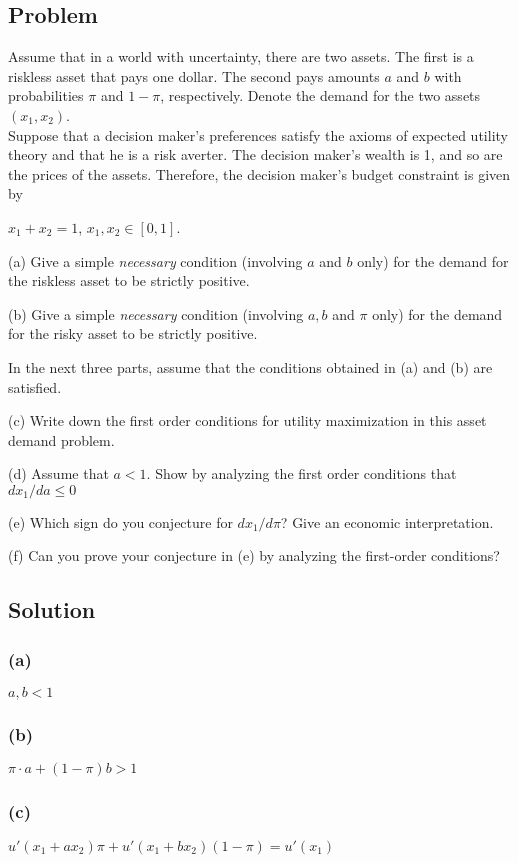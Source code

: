 \documentclass[10pt, a4paper]{article}
\begin{document}
    \subsection*{Problem}
      Assume that in a world with uncertainty, there are two assets. The first is a riskless asset that pays one dollar. The second pays amounts $a$ and $b$ with probabilities $\pi$ and $1-\pi$, respectively. Denote the demand for the two assets $(x_1,x_2)$. \\
      Suppose that a decision maker's preferences satisfy the axioms of expected utility theory and that he is a risk averter. The decision maker's wealth is 1, and so are the prices of the assets. Therefore, the decision maker's budget constraint is given by 
      \begin{center}
        $x_1+x_2=1$, $x_1,x_2\in[0,1]$.
      \end{center}

      (a) Give a simple \textit{necessary} condition (involving $a$ and $b$ only) for the demand for the riskless asset to be strictly positive.

      (b) Give a simple \textit{necessary} condition (involving $a,b$ and $\pi$ only) for the demand for the risky asset to be strictly positive.
     
      In the next three parts, assume that the conditions obtained in (a) and (b) are satisfied.

      (c) Write down the first order conditions for utility maximization in this asset demand problem.

      (d) Assume that $a<1$. Show by analyzing the first order conditions that $dx_1/da\leq0$

      (e) Which sign do you conjecture for $dx_1/d\pi$? Give an economic interpretation.

      (f) Can you prove your conjecture in (e) by analyzing the first-order conditions?
    \subsection*{Solution}
      \subsubsection*{(a)}
        $a,b < 1$
      \subsubsection*{(b)}
        $\pi\cdot a + (1-\pi)b > 1$
      \subsubsection*{(c)}
        $u'(x_1+ax_2)\pi + u'(x_1 + bx_2)(1-\pi) = u'(x_1)$ \\
\end{document}
